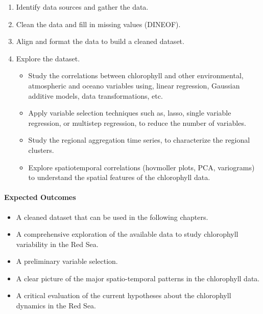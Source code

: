 \begin{enumerate} 

\item Identify data sources and gather the data.

\item Clean the data and fill in missing values (DINEOF).

\item Align and format the data to build a cleaned dataset.

\item Explore the dataset.

\begin{itemize} 

\item Study the correlations between chlorophyll and other environmental,
atmospheric and oceano variables using,
linear regression, Gaussian additive models, data transformations, etc.

\item Apply variable selection techniques such as, lasso, single variable
regression, or multistep regression, to reduce the number of variables.

\item Study the regional aggregation time series, to characterize the regional
clusters.

\item Explore spatiotemporal correlations (hovmoller plots, PCA, variograms) to
understand the spatial features of the chlorophyll data.

\end{itemize}

\end{enumerate}

\paragraph{Expected Outcomes}

\begin{itemize} 

\item A cleaned dataset that can be used in the following chapters.

\item A comprehensive exploration of the available data to study chlorophyll
variability in the Red Sea.

\item A preliminary variable selection.

\item A clear picture of the major spatio-temporal patterns in the
chlorophyll data.

\item A critical evaluation of the current hypotheses about the chlorophyll
dynamics in the Red Sea.

\end{itemize}
